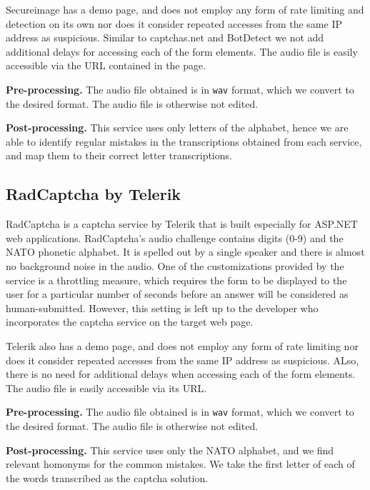 Secureimage has a demo page, and does not employ any form of rate limiting and detection on its own nor does it 
consider repeated accesses from the same IP address as suspicious. Similar to captchas.net and BotDetect we not add
additional delays for accessing each of the form elements. The audio file is easily accessible via the URL contained in the page.

\textbf{Pre-processing.} The audio file obtained is in \texttt{wav} format, which we convert to the desired format. 
The audio file is otherwise not edited.

\textbf{Post-processing.} This service uses only letters of the alphabet, hence we are able to identify regular mistakes in the 
transcriptions obtained from each service, and map them to their correct letter transcriptions.


\subsection{RadCaptcha by Telerik}

RadCaptcha is a captcha service by Telerik that is built especially for ASP.NET 
web applications. 
RadCaptcha's audio challenge contains digits (0-9) and the NATO phonetic alphabet. It is 
spelled out by a single speaker and there is almost no background noise in the audio. 
One of the customizations provided by the service is a throttling measure, which requires the form to 
be displayed to the user for a particular number of seconds before an answer will be considered as 
human-submitted. However, this setting is left up to the developer who incorporates the captcha 
service on the target web page.

Telerik also has a demo page, and does not employ any form of rate limiting nor does it consider repeated 
accesses from the same IP address as suspicious. ALso, there is no need for additional delays when accessing 
each of the form elements. The audio file is easily accessible via its URL.

\textbf{Pre-processing.} The audio file obtained is in \texttt{wav} format, which we convert to the desired format.
The audio file is otherwise not edited.

\textbf{Post-processing.} This service uses only the NATO alphabet, and we find relevant homonyms for the common mistakes.
We take the first letter of each of the words transcribed as the captcha solution.

